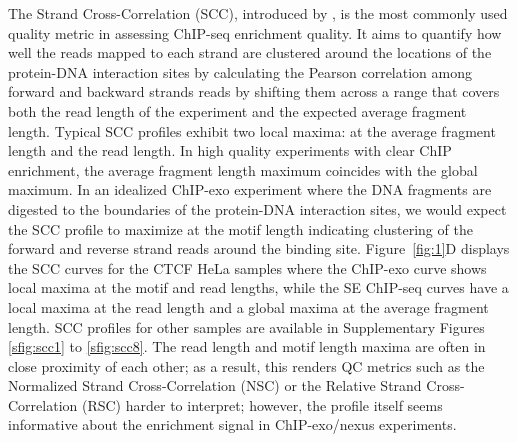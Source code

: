 \documentclass{bmcart}
\newcommand{\SK}[1]{\textcolor{red}{SK: #1}}
\newcommand{\RW}[1]{\textcolor{blue}{RW: #1}}
\begin{document}
The Strand Cross-Correlation (SCC), introduced by \cite{strandcc}, is the most commonly used quality metric in assessing ChIP-seq enrichment quality. It aims to quantify  how well the reads mapped to each strand are clustered around the locations of the protein-DNA interaction sites by calculating the Pearson correlation among forward and backward strands reads by shifting them across a range that covers both the read length of the experiment and the expected average fragment length. Typical SCC profiles exhibit two local maxima: at the average fragment length and the read length. In high quality experiments with clear ChIP enrichment, the average fragment length maximum coincides with the global maximum. In an idealized ChIP-exo experiment where the DNA fragments are digested to the boundaries of the protein-DNA interaction sites, we would expect the SCC profile to maximize at the motif length indicating clustering of the forward and reverse strand reads around the binding site. Figure~\ref{fig:1}D displays the SCC curves for the CTCF HeLa samples where the ChIP-exo curve shows local maxima at the motif and read lengths, while the SE ChIP-seq curves have a local maxima at the read length and a global maxima at the average fragment length. SCC profiles for other samples are available in Supplementary Figures \ref{sfig:scc1} to \ref{sfig:scc8}. The read length and motif length maxima are often in close proximity of each other; as a result, this renders QC metrics such as the Normalized Strand Cross-Correlation (NSC) or the Relative Strand Cross-Correlation (RSC) harder to interpret; however, the profile itself seems informative about the enrichment signal in ChIP-exo/nexus experiments. 



\end{document}

